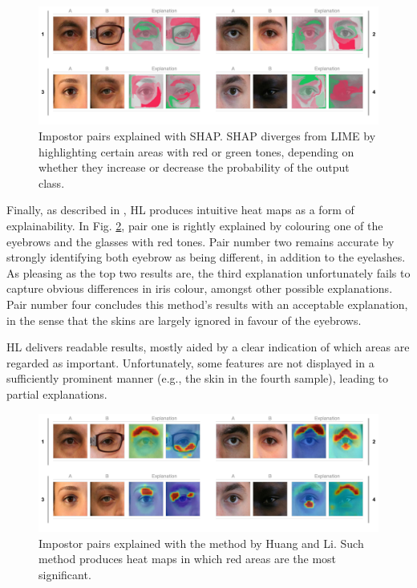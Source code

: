 \begin{figure}[h]
\centering
\includegraphics[width=\textwidth]{figures/figure_35.pdf}
\caption{Impostor pairs explained with \ac{SHAP}. \ac{SHAP} diverges from \ac{LIME} by highlighting certain areas with red or green tones, depending on whether they increase or decrease the probability of the output class.}
\label{fig:impostor_pairs_shap}
\end{figure}

Finally, as described in \cite{interpretability_by_parts}, HL produces intuitive heat maps as a form of explainability. In Fig. \ref{fig:impostor_pairs_by_parts}, pair one is rightly explained by colouring one of the eyebrows and the glasses with red tones. Pair number two remains accurate by strongly identifying both eyebrow as being different, in addition to the eyelashes. As pleasing as the top two results are, the third explanation unfortunately fails to capture obvious differences in iris colour, amongst other possible explanations. Pair number four concludes this method's results with an acceptable explanation, in the sense that the skins are largely ignored in favour of the eyebrows.

HL delivers readable results, mostly aided by a clear indication of which areas are regarded as important. Unfortunately, some features are not displayed in a sufficiently prominent manner (e.g., the skin in the fourth sample), leading to partial explanations.

\begin{figure}[h]
\centering
\includegraphics[width=\textwidth]{figures/figure_36.pdf}
\caption{Impostor pairs explained with the method by Huang and Li. Such method produces heat maps in which red areas are the most significant.}
\label{fig:impostor_pairs_by_parts}
\end{figure}

